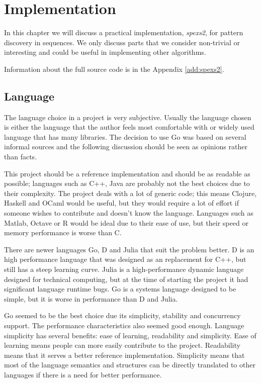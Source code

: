 \chapter{Implementation}
\label{c:implementation}

In this chapter we will discuss a practical implementation, \emph{spexs2}, for pattern discovery in sequences. We only discuss parts that we consider non-trivial or interesting and could be useful in implementing other algorithms.

Information about the full source code is in the Appendix \ref{add:spexs2}.

\section{Language}

The language choice in a project is very subjective. Usually the language chosen is either the language that the author feels most comfortable with or widely used language that has many libraries. The decision to use Go was based on several informal sources\cite{HammerPrinciple,LanguageShootout,LoopRecognition,go,clojure,julia} and the following discussion should be seen as opinions rather than facts.

This project should be a reference implementation and should be as readable as possible; languages such as C++, Java are probably not the best choices due to their complexity. The project deals with a lot of generic code; this means Clojure, Haskell and OCaml would be useful, but they would require a lot of effort if someone wishes to contribute and doesn't know the language. Languages such as Matlab, Octave or R would be ideal due to their ease of use, but their speed or memory performance is worse than C.

There are newer languages Go, D and Julia that suit the problem better. D is an high performance language that was designed as an replacement for C++, but still has a steep learning curve. Julia is a high-performance dynamic language designed for technical computing, but at the time of starting the project it had significant language runtime bugs. Go is a systems language designed to be simple, but it is worse in performance than D and Julia.

Go seemed to be the best choice due its simplicity, stability and concurrency support. The performance characteristics also seemed good enough. Language simplicity has several benefits: ease of learning, readability and simplicity. Ease of learning means people can more easily contribute to the project. Readability means that it serves a better reference implementation. Simplicity means that most of the language semantics and structures can be directly translated to other languages if there is a need for better performance.

